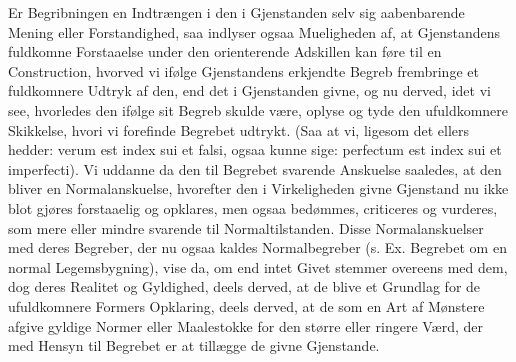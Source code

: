 \documentclass[12pt]{book}
\def\textit#1{#1}%
\def\emph#1{#1}%
\newcommand{\opage}[1]{\marginnote{\footnotesize\textit{[#1]}}}
\begin{document}
Er Begribningen en Indtrængen i den i Gjenstanden selv sig aabenbarende Mening
eller Forstandighed, saa indlyser ogsaa Mueligheden
\opage{119} af, at Gjenstandens fuldkomne Forstaaelse under den orienterende Adskillen kan
føre til en Construction, hvorved vi ifølge Gjenstandens erkjendte Begreb
frembringe et fuldkomnere Udtryk af den, end det i Gjenstanden givne, og nu
derved, idet vi see, hvorledes den ifølge sit Begreb skulde være, oplyse og tyde
den ufuldkomnere Skikkelse, hvori vi forefinde Begrebet udtrykt. (Saa at vi,
ligesom det ellers hedder: \textit{verum est index sui et falsi}, ogsaa kunne
sige: \textit{perfectum est index sui et imperfecti}). Vi uddanne da den til
Begrebet svarende Anskuelse saaledes, at den bliver en \emph{Normalanskuelse},
hvorefter den i Virkeligheden givne Gjenstand nu ikke blot gjøres forstaaelig og
opklares, men ogsaa bedømmes, criticeres og vurderes, som mere eller mindre
svarende til Normaltilstanden. Disse Normalanskuelser med deres Begreber, der nu
ogsaa kaldes \emph{Normalbegreber} (s. Ex. Begrebet om en \emph{normal
Legemsbygning}), vise da, om end intet Givet stemmer overeens med dem, dog deres
Realitet og Gyldighed, deels derved, at de blive et Grundlag for de
ufuldkomnere Formers Opklaring, deels derved, at de som en Art af
\emph{Mønstere} afgive gyldige Normer eller Maalestokke for den større eller
ringere Værd, der med Hensyn til Begrebet er at tillægge de givne Gjenstande.
\end{document}

